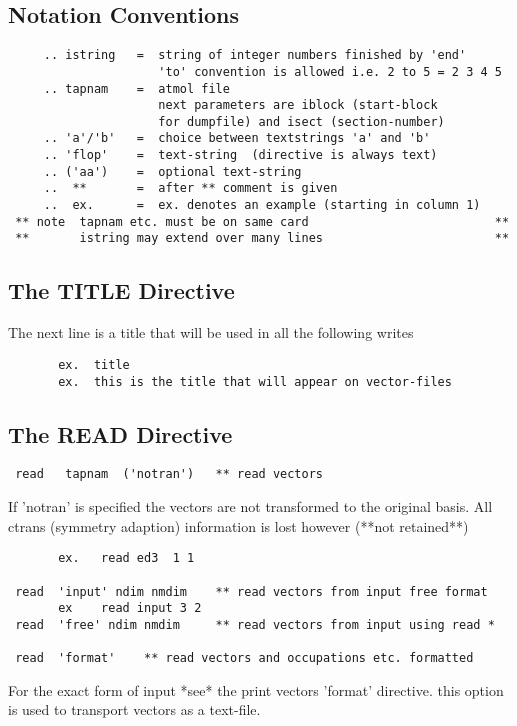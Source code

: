 \documentclass[11pt,fleqn]{article}
\begin{document}
\subsection{Notation Conventions}

{
\footnotesize
\begin{verbatim}
     .. istring   =  string of integer numbers finished by 'end'
                     'to' convention is allowed i.e. 2 to 5 = 2 3 4 5
     .. tapnam    =  atmol file 
                     next parameters are iblock (start-block
                     for dumpfile) and isect (section-number)
     .. 'a'/'b'   =  choice between textstrings 'a' and 'b'
     .. 'flop'    =  text-string  (directive is always text)
     .. ('aa')    =  optional text-string
     ..  **       =  after ** comment is given
     ..  ex.      =  ex. denotes an example (starting in column 1)
 ** note  tapnam etc. must be on same card                          **
 **       istring may extend over many lines                        **
\end{verbatim}
}

\subsection{The TITLE Directive}

The next line is a title that will be used in all the following writes

{
\footnotesize
\begin{verbatim} 
       ex.  title
       ex.  this is the title that will appear on vector-files
\end{verbatim}
}

\subsection{The READ Directive}

{
\footnotesize
\begin{verbatim} 
 read   tapnam  ('notran')   ** read vectors
\end{verbatim} 
}
If 'notran' is specified the vectors are not transformed to the
original basis. All ctrans (symmetry adaption) information is lost
however (**not retained**)

{
\footnotesize
\begin{verbatim} 
       ex.   read ed3  1 1

 read  'input' ndim nmdim    ** read vectors from input free format
       ex    read input 3 2
 read  'free' ndim nmdim     ** read vectors from input using read *

 read  'format'    ** read vectors and occupations etc. formatted
\end{verbatim}
}
For the exact form of input *see* the print vectors 'format' directive.
this option is used to transport vectors as a text-file.
\end{document}
